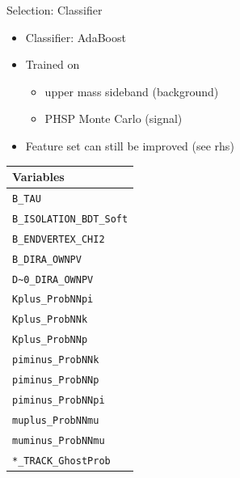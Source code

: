 \documentclass[compress,aspectratio=1610]{beamer}
\begin{document}
\begin{frame}{Selection: Classifier}
  \begin{minipage}{0.6\textwidth}
    \begin{itemize}
      \item Classifier: AdaBoost
      \item Trained on
        \begin{itemize}
          \item upper \PBz mass sideband (background)
          \item \HepProcess{\PBzero\to\APDzero\Pmu\Pmu} PHSP Monte Carlo (signal)
        \end{itemize}
      \item Feature set can still be improved (see rhs)
    \end{itemize}
  \end{minipage}
  \begin{minipage}{0.38\textwidth}
  \centering
  {\footnotesize
  \begin{tabular}{l}
  \toprule
  Variables \\
  \midrule
  \texttt{B\_TAU} \\
  \texttt{B\_ISOLATION\_BDT\_Soft} \\
  \texttt{B\_ENDVERTEX\_CHI2} \\
  \texttt{B\_DIRA\_OWNPV} \\
  \texttt{D\textasciitilde0\_DIRA\_OWNPV} \\
  \texttt{Kplus\_ProbNNpi} \\
  \texttt{Kplus\_ProbNNk} \\
  \texttt{Kplus\_ProbNNp} \\
  \texttt{piminus\_ProbNNk} \\
  \texttt{piminus\_ProbNNp} \\
  \texttt{piminus\_ProbNNpi} \\
  \texttt{muplus\_ProbNNmu} \\
  \texttt{muminus\_ProbNNmu} \\
  \texttt{*\_TRACK\_GhostProb} \\
  \bottomrule
  \end{tabular}}
  \end{minipage}
\end{frame}
\end{document}
